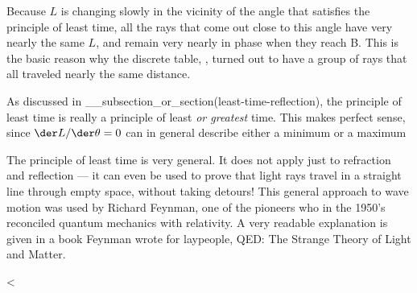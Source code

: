 Because $L$ is changing slowly in the vicinity of the angle
that satisfies the principle of least time, all the rays
that come out close to this angle have very nearly the same
$L$, and remain very nearly in phase when they reach B.
This is the basic reason why the discrete table, , turned
out to have a group of rays that all traveled nearly the same distance.

As discussed in __subsection_or_section(least-time-reflection), the principle of least time is
really a principle of least \emph{or greatest} time. This
makes perfect sense, since $\der L/\der \theta =0$ can in general
describe either a minimum or a maximum

The principle of least time is very general. It does not
apply just to refraction and reflection --- it can even be
used to prove that light rays travel in a straight line
through empty space, without taking detours! This general
approach to wave motion was used by Richard Feynman, one of
the pioneers who in the 1950's reconciled quantum mechanics
with relativity. A very readable explanation is
given in a book Feynman wrote for laypeople, QED: The
Strange Theory of Light and Matter.

<%

